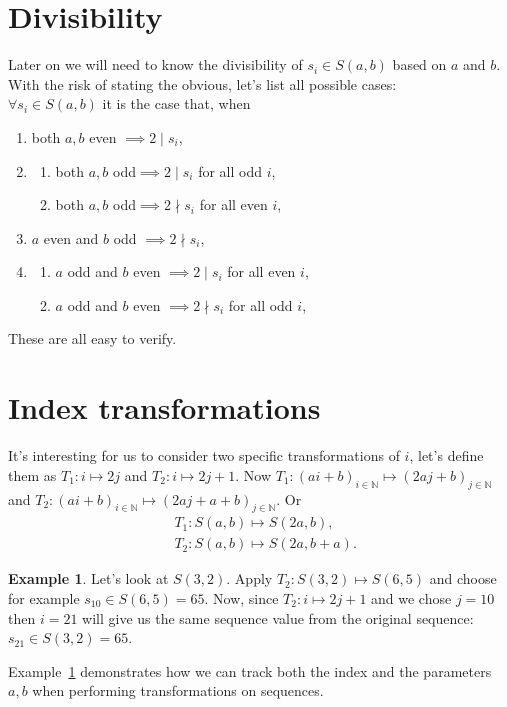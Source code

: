 \documentclass{article}
\theoremstyle{definition}
\newtheorem{example}{Example}[section]
\begin{document}
\section{Divisibility}
Later on we will need to know the divisibility of $s_i\in S(a,b)$ based on $a$ and $b$. With the risk of stating the obvious, let's list all possible cases:
%
\\[.4cm]
%
$\forall s_i \in S(a,b)$ it is the case that, when
\begin{enumerate}
    \item
    both $a,b$ even $ \implies 2\mid s_i$,
    \item
    \begin{enumerate}
        \item
        both $a,b$ odd$\implies 2\mid s_i$ for all odd $i$,
        \item
        both $a,b$ odd$\implies 2\nmid s_i$ for all even $i$,
    \end{enumerate}
    \item
    $a$ even and $b$ odd $\implies 2\nmid s_i$,
    \item
    \begin{enumerate}
        \item
        $a$ odd and $b$ even $\implies 2\mid s_i$ for all even $i$,
        \item
        $a$ odd and $b$ even $\implies 2\nmid s_i$ for all odd $i$,
    \end{enumerate}
\end{enumerate}
These are all easy to verify.

\section{Index transformations}
It's interesting for us to consider two specific transformations of $i$, let's define them as $T_1: i \longmapsto 2j$ and $T_2: i \longmapsto 2j+1$. Now $T_1: (ai+b)_{i\in\mathbb{N}} \longmapsto (2aj+b)_{j\in\mathbb{N}}$ and $T_2: (ai+b)_{i\in\mathbb{N}} \longmapsto (2aj+a+b)_{j\in\mathbb{N}}$. Or
\begin{equation*}
\begin{split}
    & T_1: S(a,b) \longmapsto S(2a,b), \\
    & T_2: S(a,b) \longmapsto S(2a,b+a).
\end{split}
\end{equation*}

\begin{example}\label{example:ex1}
Let's look at $S(3,2)$. Apply $T_2: S(3,2)\longmapsto S(6,5)$ and choose for example $s_{10}\in S(6,5) = 65$. Now, since $T_2: i \longmapsto 2j + 1$ and we chose $j=10$ then $i=21$ will give us the same sequence value from the original sequence: $s_{21}\in S(3,2) = 65$.
\end{example}
%
\noindent
Example~\ref{example:ex1} demonstrates how we can track both the index and the parameters $a,b$ when performing transformations on sequences.
\end{document}
